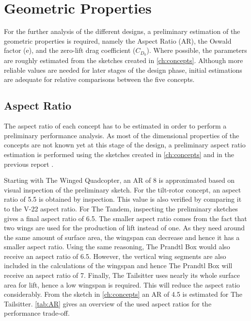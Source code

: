 \section{Geometric Properties}
\label{sec:geom_prop}

For the further analysis of the different designs, a preliminary estimation of the geometric properties is required, namely the Aspect Ratio (AR), the Oswald factor (e), and the zero-lift drag coefficient ($C_{D_{0}}$). Where possible, the parameters are roughly estimated from the sketches created in \autoref{ch:concepts}. Although more reliable values are needed for later stages of the design phase, initial estimations are adequate for relative comparisons between the five concepts. 

\subsection{Aspect Ratio}
\label{sec:aspe_rati}

The aspect ratio of each concept has to be estimated in order to perform a preliminary performance analysis. As most of the dimensional properties of the concepts are not known yet at this stage of the design, a preliminary aspect ratio estimation is performed using the sketches created in \autoref{ch:concepts} and in the previous report \cite{baseline}.

Starting with The Winged Quadcopter, an AR of 8 is approximated based on visual inspection of the preliminary sketch.
For the tilt-rotor concept, an aspect ratio of 5.5 is obtained by inspection. This value is also verified by comparing it to the V-22 aspect ratio.
For The Tandem, inspecting the preliminary sketches gives a final aspect ratio of 6.5. The smaller aspect ratio comes from the fact that two wings are used for the production of lift instead of one. As they need around the same amount of surface area, the wingspan can decrease and hence it has a smaller aspect ratio. Using the same reasoning, The Prandtl Box would also receive an aspect ratio of 6.5. However, the vertical wing segments are also included in the calculations of the wingspan and hence The Prandtl Box will receive an aspect ratio of 7.
Finally, The Tailsitter uses nearly its whole surface area for lift, hence a low wingspan is required. This will reduce the aspect ratio considerably. From the sketch in \autoref{ch:concepts} an AR of 4.5 is estimated for The Tailsitter. \autoref{tab:AR} gives an overview of the used aspect ratios for the performance trade-off.

